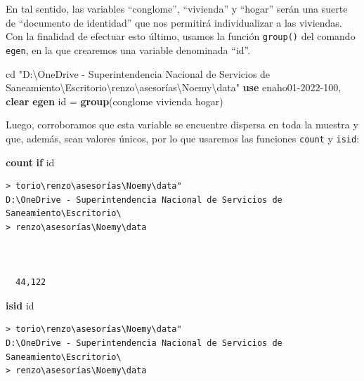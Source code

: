 \documentclass[
]{book}
\newenvironment{Shaded}{\begin{snugshade}}{\end{snugshade}}
\newcommand{\CharTok}[1]{\textcolor[rgb]{0.31,0.60,0.02}{#1}}
\newcommand{\FunctionTok}[1]{\textcolor[rgb]{0.13,0.29,0.53}{\textbf{#1}}}
\newcommand{\KeywordTok}[1]{\textcolor[rgb]{0.13,0.29,0.53}{\textbf{#1}}}
\newcommand{\NormalTok}[1]{#1}
\newcommand{\StringTok}[1]{\textcolor[rgb]{0.31,0.60,0.02}{#1}}
\theoremstyle{definition}
\theoremstyle{definition}
\theoremstyle{definition}
\theoremstyle{definition}
\theoremstyle{remark}
\begin{document}
En tal sentido, las variables ``conglome'', ``vivienda'' y ``hogar'' serán una suerte de ``documento de identidad'' que nos permitirá individualizar a las viviendas. Con la finalidad de efectuar esto último, usamos la función \texttt{group()} del comando \texttt{egen}, en la que crearemos una variable denominada ``id''.

\begin{Shaded}
\begin{Highlighting}[]
\NormalTok{cd }\StringTok{"D:\textbackslash{}OneDrive {-} Superintendencia Nacional de Servicios de Saneamiento\textbackslash{}Escritorio}\CharTok{\textbackslash{}r}\StringTok{enzo}\CharTok{\textbackslash{}a}\StringTok{sesorías\textbackslash{}Noemy\textbackslash{}data"}
\KeywordTok{use}\NormalTok{ enaho01{-}2022{-}100, }\KeywordTok{clear}
\KeywordTok{egen}\NormalTok{ id = }\FunctionTok{group}\NormalTok{(conglome vivienda hogar)}
\end{Highlighting}
\end{Shaded}

Luego, corroboramos que esta variable se encuentre dispersa en toda la muestra y que, además, sean valores únicos, por lo que usaremos las funciones \texttt{count} y \texttt{isid}:

\begin{Shaded}
\begin{Highlighting}[]
\FunctionTok{count} \KeywordTok{if}\NormalTok{ id}
\end{Highlighting}
\end{Shaded}

\begin{verbatim}
> torio\renzo\asesorías\Noemy\data"
D:\OneDrive - Superintendencia Nacional de Servicios de Saneamiento\Escritorio\
> renzo\asesorías\Noemy\data



  44,122
\end{verbatim}

\begin{Shaded}
\begin{Highlighting}[]
\KeywordTok{isid}\NormalTok{ id}
\end{Highlighting}
\end{Shaded}

\begin{verbatim}
> torio\renzo\asesorías\Noemy\data"
D:\OneDrive - Superintendencia Nacional de Servicios de Saneamiento\Escritorio\
> renzo\asesorías\Noemy\data
\end{verbatim}
\end{document}
